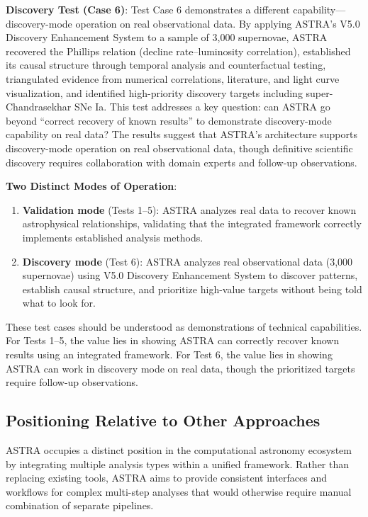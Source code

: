 \documentclass[usenatbib]{rasti}
\begin{document}
\textbf{Discovery Test (Case 6)}: Test Case 6 demonstrates a different capability---discovery-mode operation on real observational data. By applying ASTRA's V5.0 Discovery Enhancement System to a sample of 3,000 supernovae, ASTRA recovered the Phillips relation (decline rate--luminosity correlation), established its causal structure through temporal analysis and counterfactual testing, triangulated evidence from numerical correlations, literature, and light curve visualization, and identified high-priority discovery targets including super-Chandrasekhar SNe Ia. This test addresses a key question: can ASTRA go beyond ``correct recovery of known results'' to demonstrate discovery-mode capability on real data? The results suggest that ASTRA's architecture supports discovery-mode operation on real observational data, though definitive scientific discovery requires collaboration with domain experts and follow-up observations.

\textbf{Two Distinct Modes of Operation}:
\begin{enumerate}
\item \textbf{Validation mode} (Tests 1--5): ASTRA analyzes real data to recover known astrophysical relationships, validating that the integrated framework correctly implements established analysis methods.
\item \textbf{Discovery mode} (Test 6): ASTRA analyzes real observational data (3,000 supernovae) using V5.0 Discovery Enhancement System to discover patterns, establish causal structure, and prioritize high-value targets without being told what to look for.
\end{enumerate}

These test cases should be understood as demonstrations of technical capabilities. For Tests 1--5, the value lies in showing ASTRA can correctly recover known results using an integrated framework. For Test 6, the value lies in showing ASTRA can work in discovery mode on real data, though the prioritized targets require follow-up observations.

\subsection{Positioning Relative to Other Approaches}

ASTRA occupies a distinct position in the computational astronomy ecosystem by integrating multiple analysis types within a unified framework. Rather than replacing existing tools, ASTRA aims to provide consistent interfaces and workflows for complex multi-step analyses that would otherwise require manual combination of separate pipelines.
\end{document}
